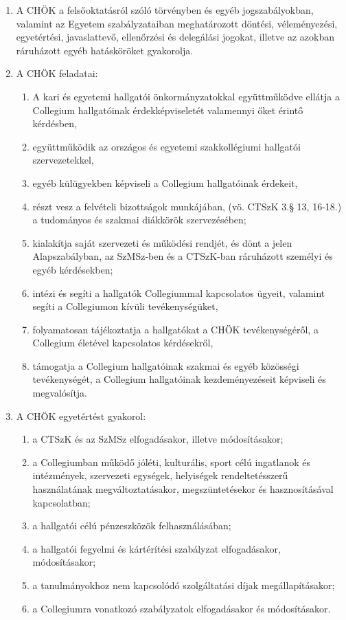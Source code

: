 \documentclass{../styles/rulebook}
\begin{document}
\begin{enumerate}
	\item A CHÖK a felsőoktatásról szóló törvényben és egyéb jogszabályokban, valamint az Egyetem szabályzataiban meghatározott döntési, véleményezési, egyetértési, javaslattevő, ellenőrzési és delegálási jogokat, illetve az azokban ráruházott egyéb hatásköröket gyakorolja.
	\item A CHÖK feladatai:
	\begin{enumerate}
		\item A kari és egyetemi hallgatói önkormányzatokkal együttműködve ellátja a Collegium hallgatóinak érdekképviseletét valamennyi őket érintő kérdésben,
		\item együttműködik az országos és egyetemi szakkollégiumi hallgatói szervezetekkel,
		\item egyéb külügyekben képviseli a Collegium hallgatóinak érdekeit,
		\item részt vesz a felvételi bizottságok munkájában, (vö. CTSzK 3.§ 13, 16-18.) a tudományos és szakmai diákkörök szervezésében;
		\item kialakítja saját szervezeti és működési rendjét, és dönt a jelen Alapszabályban, az SzMSz-ben és a CTSzK-ban ráruházott személyi és egyéb kérdésekben;
		\item intézi és segíti a hallgatók Collegiummal kapcsolatos ügyeit, valamint segíti a Collegiumon kívüli tevékenységüket,
		\item folyamatosan tájékoztatja a hallgatókat a CHÖK tevékenységéről, a Collegium életével kapcsolatos kérdésekről,
		\item támogatja a Collegium hallgatóinak szakmai és egyéb közösségi tevékenységét, a Collegium hallgatóinak kezdeményezéseit képviseli és megvalósítja.
	\end{enumerate}
	\item A CHÖK egyetértést gyakorol:
	\begin{enumerate}
		\item a CTSzK és az SzMSz elfogadásakor, illetve módosításakor;
		\item a Collegiumban működő jóléti, kulturális, sport célú ingatlanok és intézmények, szervezeti egységek, helyiségek rendeltetésszerű használatának megváltoztatásakor, megszüntetésekor és hasznosításával kapcsolatban;
		\item a hallgatói célú pénzeszközök felhasználásában;
		\item a hallgatói fegyelmi és kártérítési szabályzat elfogadásakor, módosításakor;
		\item a tanulmányokhoz nem kapcsolódó szolgáltatási díjak megállapításakor;
		\item a Collegiumra vonatkozó szabályzatok elfogadásakor és módosításakor.
	\end{enumerate}
\end{enumerate}
\end{document}

